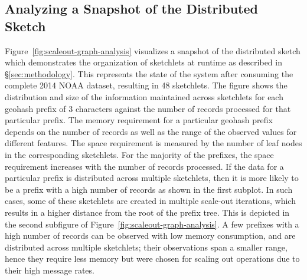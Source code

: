 \documentclass[9pt,journal,compsoc]{IEEEtran}
\begin{document}
\subsection{Analyzing a Snapshot of the Distributed Sketch}
Figure~\ref{fig:scaleout-graph-analysis} visualizes a snapshot of the distributed sketch which demonstrates the organization of sketchlets at runtime as described in \S\ref{sec:methodology}. 
This represents the state of the system after consuming the complete 2014 NOAA dataset, resulting in 48 sketchlets. 
The figure shows the distribution and size of the information maintained across sketchlets for each geohash prefix of 3 characters against the number of records processed for that particular prefix.
The memory requirement for a particular geohash prefix depends on the number of records as well as the range of the observed values for different features.
The space requirement is measured by the number of leaf nodes in the corresponding sketchlets.
For the majority of the prefixes, the space requirement increases with the number of records processed.
If the data for a particular prefix is distributed across multiple sketchlets, then it is more likely to be a prefix with a high number of records as shown in the first subplot.
In such cases, some of these sketchlets are created in multiple scale-out iterations, which results in a higher distance from the root of the prefix tree. This is depicted in the second subfigure of Figure~\ref{fig:scaleout-graph-analysis}.
A few prefixes with a high number of records can be observed with low memory consumption, and are distributed across multiple sketchlets; their observations span a smaller range, hence they require less memory but were chosen for scaling out operations due to their high message rates. 
\end{document}
